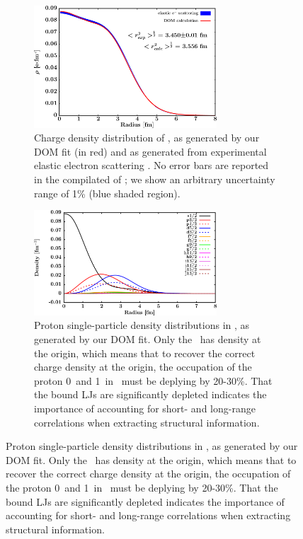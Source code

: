 \begin{figure}[tb]
    \centering
    \begin{subfigure}[c]{\textwidth}
        \centering
        \includegraphics[width=0.75\textwidth]{figures/ca40_chargeDensity.png}
        \caption[Proton single-particle density distributions in \caForty]
        {
            Charge density distribution of \caForty, as generated
            by our DOM fit (in red) and as generated from experimental
            elastic electron scattering \cite{DeVries1987}. No error bars are
            reported in the compilated of \cite{DeVries1987}; we show an
            arbitrary uncertainty range of 1\% (blue shaded region).
        }
        \label{Ca40ChargeDensity}
    \end{subfigure}\vspace{16pt}
    \begin{subfigure}[c]{\textwidth}
        \centering
        \includegraphics[width=0.75\textwidth]{figures/ca40_protonLJDensityDist.png}
        \caption[Proton single-particle density distributions in \caForty]
        {
            Proton single-particle density distributions in \caForty, as generated
            by our DOM fit. Only the \sOne\ has density at the origin, which
            means that to recover the correct charge density at the origin, the
            occupation of the proton 0\sOne\ and 1\sOne\ in \caForty\ must be
            deplying by 20-30\%. That the bound LJs are significantly
            depleted indicates the importance of
            accounting for short- and long-range correlations when extracting
            structural information.
        }
        \label{s1Depletion}
    \end{subfigure}
\end{figure}

